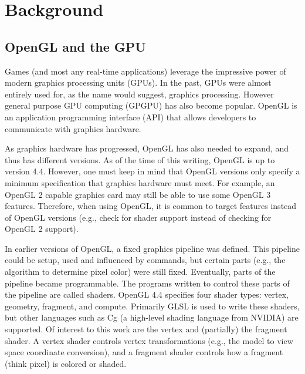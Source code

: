\section{Background}

\subsection{OpenGL and the GPU}
Games (and most any real-time applications) leverage the impressive power of modern graphics processing units (GPUs).
In the past, GPUs were almost entirely used for, as the name would suggest, graphics processing.
However general purpose GPU computing (GPGPU) has also become popular.
OpenGL is an application programming interface (API) that allows developers to communicate with graphics hardware.

As graphics hardware has progressed, OpenGL has also needed to expand, and thus has different versions.
As of the time of this writing, OpenGL is up to version 4.4.
However, one must keep in mind that OpenGL versions only specify a minimum specification that graphics hardware must meet.
For example, an OpenGL 2 capable graphics card may still be able to use some OpenGL 3 features.
Therefore, when using OpenGL, it is common to target features instead of OpenGL versions (e.g., check for shader support instead of checking for OpenGL 2 support).

In earlier versions of OpenGL, a fixed graphics pipeline was defined.
This pipeline could be setup, used and influenced by commands, but certain parts (e.g., the algorithm to determine pixel color) were still fixed.
Eventually, parts of the pipeline became programmable.
The programs written to control these parts of the pipeline are called shaders.
OpenGL 4.4 specifies four shader types: vertex, geometry, fragment, and compute.
Primarily GLSL is used to write these shaders, but other languages such as Cg (a high-level shading language from NVIDIA) are supported.
Of interest to this work are the vertex and (partially) the fragment shader.
A vertex shader controls vertex transformations (e.g., the model to view space coordinate conversion), and a fragment shader controls how a fragment (think pixel) is colored or shaded.

